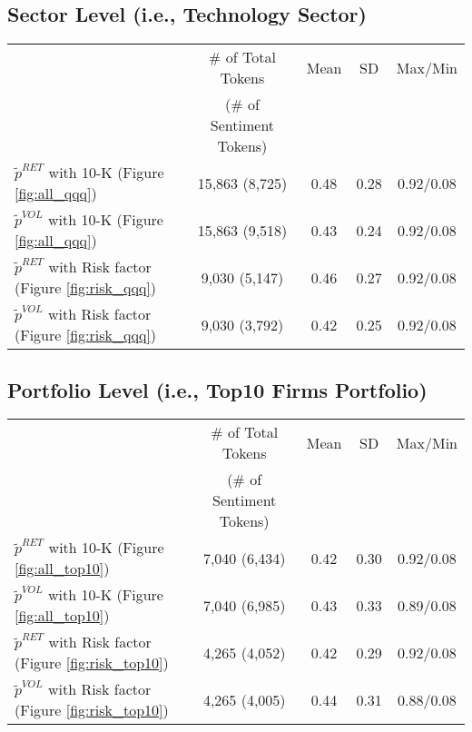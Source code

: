 \documentclass[logo,bsc,singlespacing,parskip]{infthesis}
\begin{document}
\subsection*{Sector Level (i.e., Technology Sector)}
\begin{tabular}{lcccc}
\toprule
 & \# of Total Tokens & Mean & SD & Max/Min \\
 & (\# of Sentiment Tokens) &  &  &  \\
\midrule
$\tilde{p}^{RET}$ with 10-K (Figure \ref{fig:all_qqq})& 15,863 (8,725) & 0.48 & 0.28 & 0.92/0.08 \\
$\tilde{p}^{VOL}$ with 10-K (Figure \ref{fig:all_qqq})& 15,863 (9,518) & 0.43 & 0.24 & 0.92/0.08 \\
$\tilde{p}^{RET}$ with Risk factor (Figure \ref{fig:risk_qqq})& 9,030 (5,147) & 0.46 & 0.27 & 0.92/0.08 \\
$\tilde{p}^{VOL}$ with Risk factor (Figure \ref{fig:risk_qqq})& 9,030 (3,792) & 0.42 & 0.25 & 0.92/0.08 \\
\bottomrule
\end{tabular}

\subsection*{Portfolio Level (i.e., Top10 Firms Portfolio)}
\begin{tabular}{lcccc}
\toprule
 & \# of Total Tokens & Mean & SD & Max/Min \\
 & (\# of Sentiment Tokens) &  &  &  \\
\midrule
$\tilde{p}^{RET}$ with 10-K (Figure \ref{fig:all_top10}) & 7,040 (6,434) & 0.42 & 0.30 & 0.92/0.08 \\
$\tilde{p}^{VOL}$ with 10-K (Figure \ref{fig:all_top10})& 7,040 (6,985) & 0.43 & 0.33 & 0.89/0.08 \\
$\tilde{p}^{RET}$ with Risk factor (Figure \ref{fig:risk_top10})& 4,265 (4,052) & 0.42 & 0.29 & 0.92/0.08 \\
$\tilde{p}^{VOL}$ with Risk factor (Figure \ref{fig:risk_top10})& 4,265 (4,005) & 0.44 & 0.31 & 0.88/0.08 \\
\bottomrule
\end{tabular}
\end{document}
